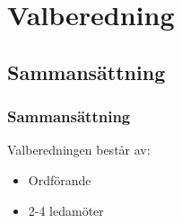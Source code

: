 \section{Valberedning}
 
\subsection{Sammansättning}
 
\subsubsection{Sammansättning}
Valberedningen består av:
\begin{itemize}
	\item Ordförande
	\item 2-4 ledamöter
\end{itemize}

